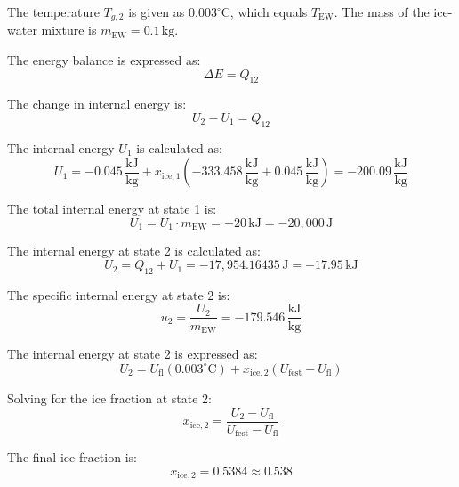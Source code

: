 The temperature \( T_{g,2} \) is given as \( 0.003^\circ \text{C} \), which equals \( T_{\text{EW}} \). The mass of the ice-water mixture is \( m_{\text{EW}} = 0.1 \, \text{kg} \).  

The energy balance is expressed as:  
\[
\Delta E = Q_{12}
\]  

The change in internal energy is:  
\[
U_2 - U_1 = Q_{12}
\]  

The internal energy \( U_1 \) is calculated as:  
\[
U_1 = -0.045 \, \frac{\text{kJ}}{\text{kg}} + x_{\text{ice},1} \left( -333.458 \, \frac{\text{kJ}}{\text{kg}} + 0.045 \, \frac{\text{kJ}}{\text{kg}} \right) = -200.09 \, \frac{\text{kJ}}{\text{kg}}
\]  

The total internal energy at state 1 is:  
\[
U_1 = U_1 \cdot m_{\text{EW}} = -20 \, \text{kJ} = -20,000 \, \text{J}
\]  

The internal energy at state 2 is calculated as:  
\[
U_2 = Q_{12} + U_1 = -17,954.16435 \, \text{J} = -17.95 \, \text{kJ}
\]  

The specific internal energy at state 2 is:  
\[
u_2 = \frac{U_2}{m_{\text{EW}}} = -179.546 \, \frac{\text{kJ}}{\text{kg}}
\]  

The internal energy at state 2 is expressed as:  
\[
U_2 = U_{\text{fl}} (0.003^\circ \text{C}) + x_{\text{ice},2} \left( U_{\text{fest}} - U_{\text{fl}} \right)
\]  

Solving for the ice fraction at state 2:  
\[
x_{\text{ice},2} = \frac{U_2 - U_{\text{fl}}}{U_{\text{fest}} - U_{\text{fl}}}
\]  

The final ice fraction is:  
\[
x_{\text{ice},2} = 0.5384 \approx 0.538
\]